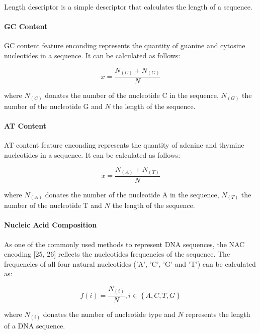 Length descriptor is a simple descriptor that calculates the length of a sequence.

\paragraph{GC Content}

\gls{GC} content feature enconding represents the quantity of guanine and cytosine nucleotides in a sequence. It can be calculated as follows:

\begin{equation}\label{eq:gc_content}
    x = \frac{N_{(C)} + N_{(G)}}{N}
\end{equation}


where $N_{(C)}$ donates the number of the nucleotide C in the sequence, $N_{(G)}$ the number of the nucleotide G and $N$ the length of the sequence.

\paragraph{AT Content}

\gls{AT} content feature enconding represents the quantity of adenine and thymine nucleotides in a sequence. It can be calculated as follows:


\begin{equation}\label{eq:at_content}
    x = \frac{N_{(A)} + N_{(T)}}{N}
\end{equation}

where $N_{(A)}$ donates the number of the nucleotide A in the sequence, $N_{(T)}$ the number of the nucleotide T and $N$ the length of the sequence.


\paragraph{Nucleic Acid Composition}

As one of the commonly used methods to represent \gls{DNA} sequences, the \gls{NAC} encoding [25, 26] reflects the nucleotides frequencies of the sequence. The frequencies of all four natural nucleotides ('A', 'C', 'G' and 'T') can be calculated as:

\begin{equation}\label{eq:NAC}
    f(i) = \frac{N_{(i)}}{N}, i \in \left\{A,C,T,G\right\}
\end{equation}

where $N_{(i)}$ donates the number of nucleotide type and $N$ represents the length of a \gls{DNA} sequence.

